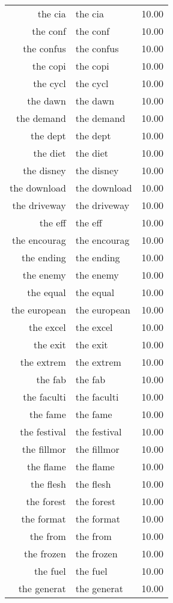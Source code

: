\begin{table}[ht]
\begin{tabular}{rlr}
  the cia & the cia & 10.00 \\ 
  the conf & the conf & 10.00 \\ 
  the confus & the confus & 10.00 \\ 
  the copi & the copi & 10.00 \\ 
  the cycl & the cycl & 10.00 \\ 
  the dawn & the dawn & 10.00 \\ 
  the demand & the demand & 10.00 \\ 
  the dept & the dept & 10.00 \\ 
  the diet & the diet & 10.00 \\ 
  the disney & the disney & 10.00 \\ 
  the download & the download & 10.00 \\ 
  the driveway & the driveway & 10.00 \\ 
  the eff & the eff & 10.00 \\ 
  the encourag & the encourag & 10.00 \\ 
  the ending & the ending & 10.00 \\ 
  the enemy & the enemy & 10.00 \\ 
  the equal & the equal & 10.00 \\ 
  the european & the european & 10.00 \\ 
  the excel & the excel & 10.00 \\ 
  the exit & the exit & 10.00 \\ 
  the extrem & the extrem & 10.00 \\ 
  the fab & the fab & 10.00 \\ 
  the faculti & the faculti & 10.00 \\ 
  the fame & the fame & 10.00 \\ 
  the festival & the festival & 10.00 \\ 
  the fillmor & the fillmor & 10.00 \\ 
  the flame & the flame & 10.00 \\ 
  the flesh & the flesh & 10.00 \\ 
  the forest & the forest & 10.00 \\ 
  the format & the format & 10.00 \\ 
  the from & the from & 10.00 \\ 
  the frozen & the frozen & 10.00 \\ 
  the fuel & the fuel & 10.00 \\ 
  the generat & the generat & 10.00 \\ 

\end{tabular}
\end{table}
